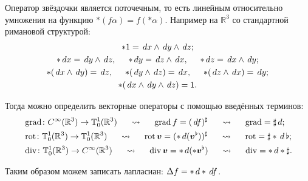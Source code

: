 Оператор звёздочки является поточечным, то есть линейным относительно умножения на функцию $*(f \alpha) = f(*\alpha)$. Например на $\mathbb{R}^3$ со стандартной римановой структурой:
\begin{gather*}
   	*1 = \, d x \wedge \, d y \wedge \, d z;
   	\\
   	*\, d x = \, d y \wedge \, d z, 
   	\hspace*{0.5 cm}
   	*\, d y = \, d z \wedge \, d x, 
   	\hspace*{0.5 cm}
   	*\, d z = \, d x \wedge \, d y;
   	\\
   	*(\, d x \wedge \, d y) = \, d z,
   	\hspace*{0.5 cm}
   	*(\, d y \wedge \, d z) = \, d x,
   	\hspace*{0.5 cm}
   	*(\, d z \wedge \, d x) = \, d y;
   	\\
   	*(\, d x \wedge \, d y \wedge \, d z) = 1.
\end{gather*}

Тогда можно определить векторные операторы с помощью введённых терминов:
\begin{align*}
   &\mathop{\mathrm{grad}}\nolimits \colon C^\infty(\mathbb{R}^3) \rightarrow \mathbb{T}_0^1 (\mathbb{R}^3)
   \hspace*{0.5 cm} 
   \leadsto 
   \hspace*{0.5 cm}
   \mathop{\mathrm{grad}}\nolimits f = (\, d f)^\sharp 
   \hspace*{0.5 cm} 
   \leadsto 
   \hspace*{0.5 cm}
   \mathop{\mathrm{grad}}\nolimits = \sharp \, d;
   \\
   &\mathop{\mathrm{rot}}\nolimits \colon \mathbb{T}_0^1(\mathbb{R}^3) \rightarrow \mathbb{T}_0^1(\mathbb{R}^3)
   \hspace*{0.5 cm} 
   \leadsto 
   \hspace*{0.5 cm}
   \mathop{\mathrm{rot}}\nolimits \mbox{\boldmath $v$} = (*\, d(\mbox{\boldmath $v$}^\flat))^\sharp
   \hspace*{0.5 cm} 
   \leadsto 
   \hspace*{0.5 cm}
   \mathop{\mathrm{rot}}\nolimits = \sharp * \, d \, \flat;
   \\
   &\mathop{\mathrm{div}}\nolimits \colon \mathbb{T}_0^1(\mathbb{R}^3) \rightarrow C^\infty(\mathbb{R}^3)
   \hspace*{0.5 cm} 
   \leadsto 
   \hspace*{0.5 cm}
   \mathop{\mathrm{div}}\nolimits \mbox{\boldmath $v$} = *\, d(*\mbox{\boldmath $v$}^\flat)
   \hspace*{0.5 cm} 
   \leadsto 
   \hspace*{0.5 cm}
   \mathop{\mathrm{div}}\nolimits = * \, d * \sharp.
\end{align*}

Таким образом можем записать лапласиан: $\Delta f = *\, d * \, d f$.  
